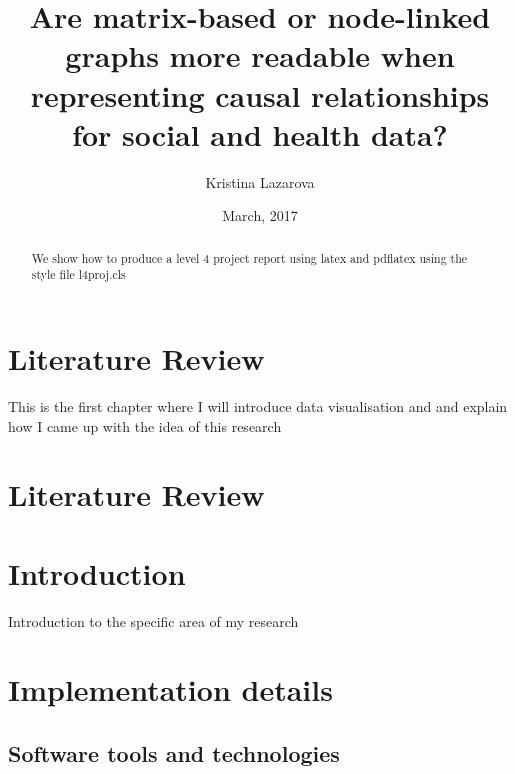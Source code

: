 \documentclass{l4proj}
\begin{document}
\title{Are matrix-based or node-linked graphs more readable when representing causal relationships for social and health data?}
\author{Kristina Lazarova}
\date{March, 2017}
\maketitle

\begin{abstract}
We show how to produce a level 4 project report using latex and pdflatex using the 
style file l4proj.cls
\end{abstract}

\educationalconsent
%
%
\tableofcontents
\chapter{Literature Review}

This is the first chapter where I will introduce data visualisation and and explain how I came up with the idea of this research
\chapter{Literature Review}



\chapter{Introduction}
Introduction to the specific area of my research

\chapter{Implementation details}

\section{Software tools and technologies}
\end{document}
